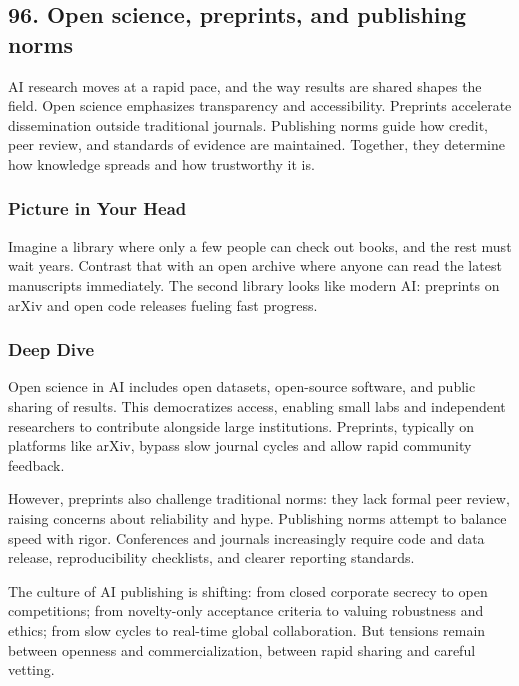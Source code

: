 \documentclass[
  letterpaper,
  DIV=11,
  numbers=noendperiod]{scrreprt}
\begin{document}
\subsection{96. Open science, preprints, and publishing
norms}\label{open-science-preprints-and-publishing-norms}

AI research moves at a rapid pace, and the way results are shared shapes
the field. Open science emphasizes transparency and accessibility.
Preprints accelerate dissemination outside traditional journals.
Publishing norms guide how credit, peer review, and standards of
evidence are maintained. Together, they determine how knowledge spreads
and how trustworthy it is.

\subsubsection{Picture in Your Head}\label{picture-in-your-head-95}

Imagine a library where only a few people can check out books, and the
rest must wait years. Contrast that with an open archive where anyone
can read the latest manuscripts immediately. The second library looks
like modern AI: preprints on arXiv and open code releases fueling fast
progress.

\subsubsection{Deep Dive}\label{deep-dive-95}

Open science in AI includes open datasets, open-source software, and
public sharing of results. This democratizes access, enabling small labs
and independent researchers to contribute alongside large institutions.
Preprints, typically on platforms like arXiv, bypass slow journal cycles
and allow rapid community feedback.

However, preprints also challenge traditional norms: they lack formal
peer review, raising concerns about reliability and hype. Publishing
norms attempt to balance speed with rigor. Conferences and journals
increasingly require code and data release, reproducibility checklists,
and clearer reporting standards.

The culture of AI publishing is shifting: from closed corporate secrecy
to open competitions; from novelty-only acceptance criteria to valuing
robustness and ethics; from slow cycles to real-time global
collaboration. But tensions remain between openness and
commercialization, between rapid sharing and careful vetting.
\end{document}
